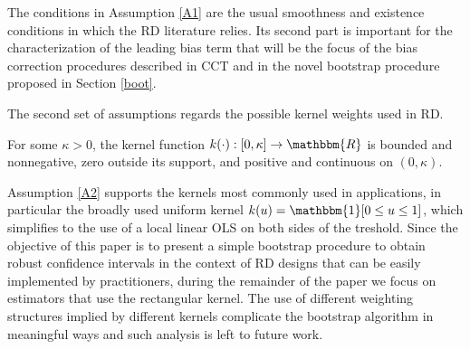 \documentclass[12pt,fleqn]{article}
\begin{document}
The conditions in Assumption \ref{A1} are the usual smoothness and existence 
conditions in which the RD literature relies. Its second part is important for 
the characterization of the leading bias term that will be the focus of the bias
correction procedures described in CCT and in the novel
 bootstrap procedure proposed in Section \ref{boot}.

The second set of assumptions regards the possible kernel weights used in RD.

\begin{assumption}\label{A2}
 For some $\kappa>0$, the kernel function $k(\cdot):[0, \kappa] \rightarrow 
 \mathbbm{R}$ is bounded and nonnegative, zero outside its support, and positive
 and continuous on $(0, \kappa)$.
\end{assumption}

Assumption \ref{A2} supports the kernels most commonly used in applications, in 
particular the broadly used uniform kernel $k(u)=\mathbbm{1}[0\leq u\leq 1]$, 
which simplifies to the use of a local linear OLS on both sides of the treshold.
Since the objective of this paper is to present a simple bootstrap procedure to 
obtain robust confidence intervals in the context of RD designs that can be 
easily implemented by practitioners, during the remainder of the paper we focus 
on estimators that use the rectangular kernel. The use of different weighting 
structures implied by different kernels complicate the bootstrap algorithm in
meaningful ways and such analysis is left to future work.
\end{document}
